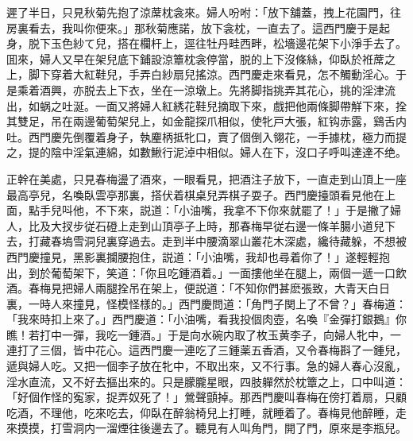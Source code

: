 遲了半日，只見秋菊先抱了涼蓆枕衾來。婦人吩咐：「放下舖蓋，拽上花園門，往房裏看去，我叫你便來。」那秋菊應諾，放下衾枕，一直去了。這西門慶于是起身，脱下玉色紗て兒，搭在欄杆上，逕往牡丹畦西畔，松墻邊花架下小淨手去了。囬來，婦人又早在架兒底下鋪設涼簟枕衾停當，脱的上下沒條絲，仰臥於袵蓆之上，脚下穿着大紅鞋兒，手弄白紗扇兒搖涼。西門慶走來看見，怎不觸動淫心。于是乘着酒興，亦脱去上下衣，坐在一涼墩上。先將脚指挑弄其花心，挑的淫津流出，如蜗之吐涎。一面又將婦人紅綉花鞋兒摘取下來，戲把他兩條脚帶觧下來，拴其雙足，吊在兩邊葡萄架兒上，如金龍探爪相似，使牝戸大張，紅钩赤露，鷄舌内吐。西門慶先倒覆着身子，執麈柄抵牝口，賣了個倒入翎花，一手據枕，極力而提之，提的陰中淫氣連綿，如數鰍行泥淖中相似。婦人在下，沒口子呼叫達達不绝。

正幹在美處，只見春梅盪了酒來，一眼看見，把酒注子放下，一直走到山頂上一座最高亭兒，名喚臥雲亭那裏，搭伏着棋桌兒弄棋子耍子。西門慶擡頭看見他在上面，點手兒呌他，不下來，説道：「小油嘴，我拿不下你來就罷了！」于是撇了婦人，比及大扠步従石磴上走到山頂亭子上時，那春梅早従右邊一條羊腸小道兒下去，打藏春塢雪洞兒裏穿過去。走到半中腰滴翠山叢花木深處，纔待藏躲，不想被西門慶撞見，黑影裏攔腰抱住，説道：「小油嘴，我却也尋着你了！」遂輕輕抱出，到於葡萄架下，笑道：「你且吃鍾酒着。」一面摟他坐在腿上，兩個一遞一口飲酒。春梅見把婦人兩腿拴吊在架上，便説道：「不知你們甚麽張致，大青天白日裏，一時人來撞見，怪模怪樣的。」西門慶問道：「角門子関上了不曾？」春梅道：「我來時扣上來了。」西門慶道：「小油嘴，看我投個肉壺，名喚『金彈打銀鵝』你瞧！若打中一彈，我吃一鍾酒。」于是向水碗内取了枚玉黄李子，向婦人牝中，一連打了三個，皆中花心。這西門慶一連吃了三鍾薬五香酒，又令春梅斟了一鍾兒，遞與婦人吃。又把一個李子放在牝中，不取出來，又不行事。急的婦人春心沒亂，淫水直流，又不好去摳出來的。只是朦朧星眼，四肢軃然於枕簟之上，口中叫道：「好個作怪的寃家，捉弄奴死了！」鶯聲顫掉。那西門慶叫春梅在傍打着扇，只顧吃酒，不理他，吃來吃去，仰臥在醉翁椅兒上打睡，就睡着了。春梅見他醉睡，走來摸摸，打雪洞内一溜煙往後邊去了。聽見有人叫角門，開了門，原來是李瓶兒。

